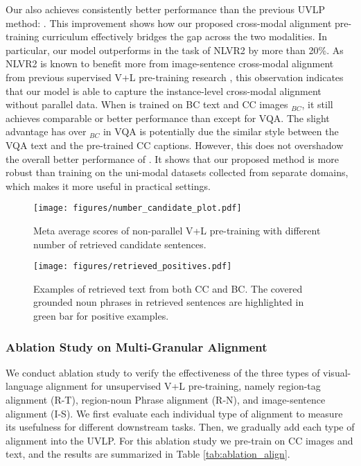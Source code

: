 Our {\ModelName } also achieves consistently better performance than the previous UVLP method: \uvisualbert. 
This improvement shows how our proposed cross-modal alignment pre-training curriculum effectively bridges the gap across the two modalities.
In particular, our model outperforms {\uvisualbert } in the task of NLVR2 by more than 20\%. 
As NLVR2 is known to benefit more from image-sentence cross-modal alignment from previous supervised V+L pre-training research \cite{chen2020uniter}, this observation indicates that our model is able to capture the instance-level cross-modal alignment without parallel data. 
When {\ModelName } is trained on BC text and CC images \ie \ModelName$_{BC}$, it still achieves comparable or better performance than {\uvisualbert } except for VQA.  
The slight advantage  {\uvisualbert } has over \ModelName$_{BC}$ in VQA is potentially due the similar style between the VQA text and the pre-trained CC captions. 
However, this does not overshadow the overall better performance of {\ModelName}. 
It shows that our proposed method is more robust than {\uvisualbert } training on the uni-modal datasets collected from separate domains, which makes it more useful in practical settings.    
\begin{figure}[h!]
\centering
\texttt{[image: figures/number\_candidate\_plot.pdf]}
\caption{Meta average scores of non-parallel V+L pre-training with different number of retrieved candidate sentences.}
\label{fig:ablation_ncandidate}
\end{figure}


\begin{figure*}[h!]
\centering
\texttt{[image: figures/retrieved\_positives.pdf]}
\caption{Examples of retrieved text from both CC and BC. The covered grounded noun phrases in retrieved sentences are highlighted in green bar for positive examples.}
\label{fig:visualization}
\end{figure*}

\subsubsection{Ablation Study on Multi-Granular Alignment}
We conduct ablation study to verify the effectiveness of the three types of visual-language alignment for unsupervised V+L pre-training, namely region-tag alignment (R-T), region-noun Phrase alignment (R-N), and image-sentence alignment (I-S). We first evaluate each individual type of alignment to measure its usefulness for different downstream tasks. Then, we gradually add each type of alignment into the UVLP.  For this ablation study we pre-train {\ModelName } on CC images and text, and the results are summarized in Table \ref{tab:ablation_align}. 

